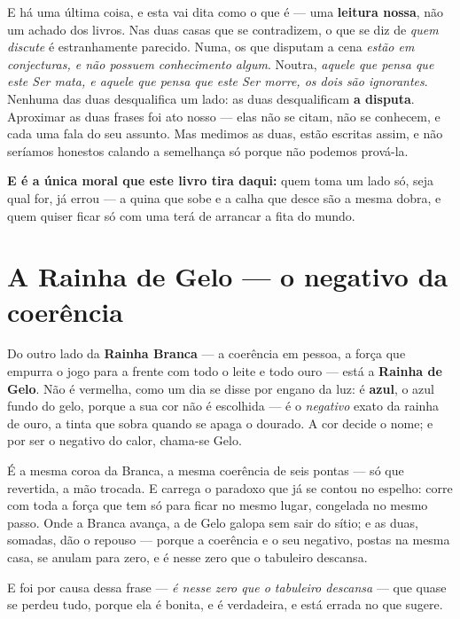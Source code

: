 \documentclass[livro.tex]{subfiles}
\begin{document}
\medskip
\noindent E há uma última coisa, e esta vai dita como o que é --- uma \textbf{leitura nossa},
não um achado dos livros. Nas duas casas que se contradizem, o que se diz de \emph{quem
discute} é estranhamente parecido. Numa, os que disputam a cena \emph{estão em conjecturas,
e não possuem conhecimento algum}. Noutra, \emph{aquele que pensa que este Ser mata, e aquele
que pensa que este Ser morre, os dois são ignorantes}. Nenhuma das duas desqualifica um lado:
as duas desqualificam \textbf{a disputa}. Aproximar as duas frases foi ato nosso --- elas não
se citam, não se conhecem, e cada uma fala do seu assunto. Mas medimos as duas, estão escritas
assim, e não seríamos honestos calando a semelhança só porque não podemos prová-la.

\textbf{E é a única moral que este livro tira daqui:} quem toma um lado só, seja qual for, já
errou --- a quina que sobe e a calha que desce são a mesma dobra, e quem quiser ficar só com
uma terá de arrancar a fita do mundo.

\chapter{A Rainha de Gelo --- o negativo da coerência}

Do outro lado da \textbf{Rainha Branca} --- a coerência em pessoa, a força que empurra o
jogo para a frente com todo o leite e todo ouro --- está a \textbf{Rainha de Gelo}. Não é
vermelha, como um dia se disse por engano da luz: é \textbf{azul}, o azul fundo do gelo,
porque a sua cor não é escolhida --- é o \emph{negativo} exato da rainha de ouro, a tinta
que sobra quando se apaga o dourado. A cor decide o nome; e por ser o negativo do calor,
chama-se Gelo.

\medskip

É a mesma coroa da Branca, a mesma coerência de seis pontas --- só que revertida, a mão
trocada. E carrega o paradoxo que já se contou no espelho: corre com toda a força que tem
só para ficar no mesmo lugar, congelada no mesmo passo. Onde a Branca avança, a de Gelo
galopa sem sair do sítio; e as duas, somadas, dão o repouso --- porque a coerência e o seu
negativo, postas na mesma casa, se anulam para zero, e é nesse zero que o tabuleiro
descansa.

\medskip

E foi por causa dessa frase --- \emph{é nesse zero que o tabuleiro descansa} --- que
quase se perdeu tudo, porque ela é bonita, e é verdadeira, e está errada no que sugere.
\end{document}
